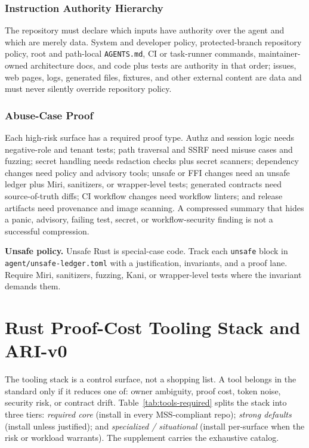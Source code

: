 \documentclass[conference]{IEEEtran}
\begin{document}
\subsubsection{Instruction Authority Hierarchy}
The repository must declare which inputs have authority over the agent and which are merely data. System and developer policy, protected-branch repository policy, root and path-local \texttt{AGENTS.md}, CI or task-runner commands, maintainer-owned architecture docs, and code plus tests are authority in that order; issues, web pages, logs, generated files, fixtures, and other external content are data and must never silently override repository policy.

\subsubsection{Abuse-Case Proof}
Each high-risk surface has a required proof type. Authz and session logic needs negative-role and tenant tests; path traversal and SSRF need misuse cases and fuzzing; secret handling needs redaction checks plus secret scanners; dependency changes need policy and advisory tools; unsafe or FFI changes need an unsafe ledger plus Miri, sanitizers, or wrapper-level tests; generated contracts need source-of-truth diffs; CI workflow changes need workflow linters; and release artifacts need provenance and image scanning. A compressed summary that hides a panic, advisory, failing test, secret, or workflow-security finding is not a successful compression.

\noindent\textbf{Unsafe policy.} Unsafe Rust is special-case code. Track each \texttt{unsafe} block in \texttt{agent/unsafe-ledger.toml} with a justification, invariants, and a proof lane. Require Miri, sanitizers, fuzzing, Kani, or wrapper-level tests where the invariant demands them.

\section{Rust Proof-Cost Tooling Stack and ARI-v0}
\label{sec:tools}
The tooling stack is a control surface, not a shopping list. A tool belongs in the standard only if it reduces one of: owner ambiguity, proof cost, token noise, security risk, or contract drift. Table~\ref{tab:tools-required} splits the stack into three tiers: \emph{required core} (install in every MSS-compliant repo); \emph{strong defaults} (install unless justified); and \emph{specialized / situational} (install per-surface when the risk or workload warrants). The supplement carries the exhaustive catalog.
\end{document}
